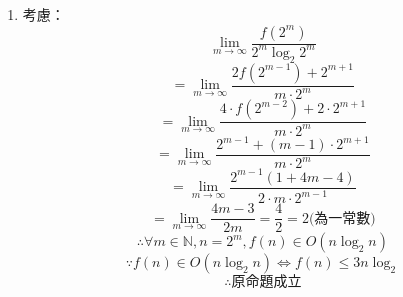 \documentclass[12pt,a4paper]{article}
\begin{document}
\begin{enumerate}
\begin{enumerate}
    \end{enumerate}
    \item 考慮：
    $$\lim_{m \to \infty}\frac{f(2^m)}{2^m\log_2 2^m}$$
    $$=\lim_{m \to \infty}\frac{2f(2^{m-1})+2^{m+1}}{m \cdot 2^m}$$
    $$=\lim_{m \to \infty}\frac{4 \cdot f(2^{m-2})+2\cdot 2^{m+1}}{m \cdot 2^m}$$
    $$=\lim_{m \to \infty}\frac{2^{m-1}+(m-1)\cdot 2^{m+1}}{m \cdot 2^m}$$
    $$=\lim_{m \to \infty}\frac{2^{m-1}(1+4m-4)}{2 \cdot m \cdot 2^{m-1}}$$
    $$=\lim_{m \to \infty}\frac{4m-3}{2m}=\frac{4}{2}=2\textrm{(為一常數)}$$
    $$\therefore \forall m \in \mathbb{N}, n=2^m, f(n) \in O(n\log_2 n)$$
    $$\because f(n)\in O(n\log_2 n) \Longleftrightarrow f(n) \leq 3n\log_2$$
    $$\therefore \textrm{原命題成立}$$
     
\end{enumerate}
\end{document}
